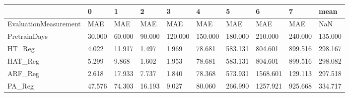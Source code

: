 \begin{tabular}{llllllllll}
\toprule
{} &      0 &      1 &      2 &       3 &       4 &       5 &        6 &       7 &    mean \\
\midrule
EvaluationMeasurement &    MAE &    MAE &    MAE &     MAE &     MAE &     MAE &      MAE &     MAE &     NaN \\
PretrainDays          & 30.000 & 60.000 & 90.000 & 120.000 & 150.000 & 180.000 &  210.000 & 240.000 & 135.000 \\
HT\_Reg                &  4.022 & 11.917 &  1.497 &   1.969 &  78.681 & 583.131 &  804.601 & 899.516 & 298.167 \\
HAT\_Reg               &  5.299 &  9.868 &  1.602 &   1.953 &  78.681 & 583.131 &  804.601 & 899.516 & 298.082 \\
ARF\_Reg               &  2.618 & 17.933 &  7.737 &   1.840 &  78.368 & 573.931 & 1568.601 & 129.113 & 297.518 \\
PA\_Reg                & 47.576 & 74.303 & 16.193 &   9.027 &  80.060 & 266.990 & 1257.921 & 925.668 & 334.717 \\
\bottomrule
\end{tabular}
